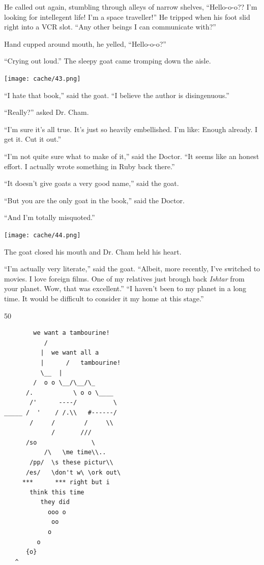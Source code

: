 \documentclass[12pt,twoside]{report}
\begin{document}
He called out again, stumbling through alleys of narrow shelves,
``Hello-o-o??  I'm looking for intellegent life!  I'm a space
traveller!''  He tripped when his foot slid right into a VCR
slot. ``Any other beings I can communicate with?''

Hand cupped around mouth, he yelled, ``Hello-o-o?''

``Crying out loud.''  The sleepy goat came tromping down the aisle.

\newpage


	\texttt{[image: cache/43.png]}

``I hate that book,'' said the goat.  ``I believe the author is
        disingenuous.''

``Really?'' asked Dr. Cham.

``I'm sure it's all true.  It's just so heavily embellished.  I'm
        like: Enough already.  I get it.  Cut it out.''

``I'm not quite sure what to make of it,'' said the Doctor.  ``It
        seems like an honest effort. I actually wrote something in
        Ruby back there.''

``It doesn't give goats a very good name,'' said the goat.

``But you are the only goat in the book,'' said the Doctor.

``And I'm totally misquoted.''

	\texttt{[image: cache/44.png]}

The goat closed his mouth and Dr. Cham held his heart.

``I'm actually very literate,'' said the goat.  ``Albeit, more
recently, I've switched to movies.  I love foreign films.  One of my
relatives just brough back {\em Ishtar} from your planet.  Wow, that
was excellent.''  ``I haven't been to my planet in a long time.  It
would be difficult to consider it my home at this stage.''

\pagebreak

	\begin{sidebar}{\vspace*{-33pt}}{50}
\vspace{6pt}
\begin{verbatim}
		we want a tambourine!
           /
          |  we want all a 
          |      /   tambourine!
          \__  |
        /  o o \__/\__/\_
      /.           \ o o \____
       /'      ----/          \
_____ /  '    / /.\\   #------/
       /     /        /     \\
             /       ///
      /so               \
           /\   \me time\\..
       /pp/  \s these pictur\\
      /es/   \don't w\ \ork out\
     ***      *** right but i
       think this time
          they did
            ooo o
             oo
            o
         o
      {o}
   ^
\end{verbatim}
\vspace{6pt}
	\end{sidebar}
\end{document}
